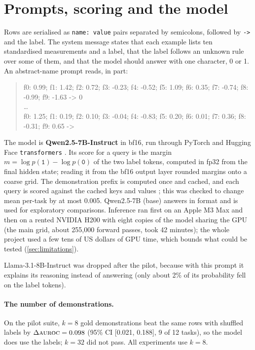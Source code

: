 \section{Prompts, scoring and the model}
\label{sec:prompts}

Rows are serialised as \texttt{name: value} pairs separated by semicolons, followed by \texttt{->} and the label.
The system message states that each example lists ten standardised measurements and a label, that the label follows an unknown rule over some of them, and that the model should answer with one character, 0 or 1.
An abstract-name prompt reads, in part:

\begin{quote}\small\ttfamily
f0: 0.99; f1: 1.42; f2: 0.72; f3: -0.23; f4: -0.52; f5: 1.09; f6: 0.35; f7: -0.74; f8: -0.99; f9: -1.63 -> 0\\
\ldots\\
f0: 1.25; f1: 0.19; f2: 0.10; f3: -0.04; f4: -0.83; f5: 0.20; f6: 0.01; f7: 0.36; f8: -0.31; f9: 0.65 ->
\end{quote}

The model is \textbf{Qwen2.5-7B-Instruct} \citep{qwen2024qwen25} in bf16, run through PyTorch and Hugging Face \texttt{transformers} \citep{paszke2019pytorch,wolf2020transformers}.
Its score for a query is the margin $m = \log p(\texttt{1}) - \log p(\texttt{0})$ of the two label tokens, computed in fp32 from the final hidden state; reading it from the bf16 output layer rounded margins onto a coarse grid.
The demonstration prefix is computed once and cached, and each query is scored against the cached keys and values \citep{pope2023efficiently,gim2024prompt}; this was checked to change mean per-task \AUROC by at most 0.005.
Qwen2.5-7B (base) answers in format and is used for exploratory comparisons. Inference ran first on an Apple M3 Max and then on a rented NVIDIA H200 with eight copies of the model sharing the GPU (the main grid, about 255,000 forward passes, took 42 minutes); the whole project used a few tens of US dollars of GPU time, which bounds what could be tested (\autoref{sec:limitations}).

Llama-3.1-8B-Instruct \citep{grattafiori2024llama3} was dropped after the pilot, because with this prompt it explains its reasoning instead of answering (only about 2\% of its probability fell on the label tokens).

\paragraph{The number of demonstrations.}
On the pilot suite, $k = 8$ gold demonstrations beat the same rows with shuffled labels by $\Delta\textsc{auroc} = 0.098$ (95\% CI [0.021, 0.188], 9 of 12 tasks), so the model does use the labels; $k = 32$ did not pass.
All experiments use $k = 8$.

